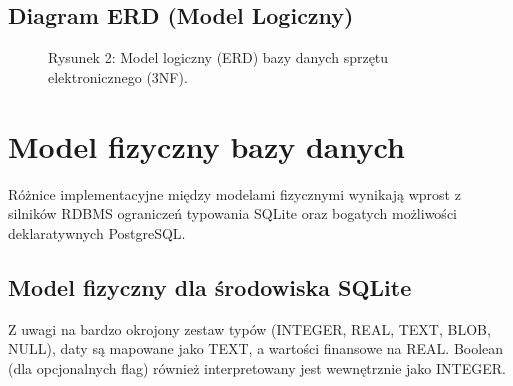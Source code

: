 \documentclass[letterpaper,10pt,polish]{sphinxmanual}
\begin{document}
\subsection{Diagram ERD (Model Logiczny)}
\label{\detokenize{rozdzia_u0142_3/BD_PlanBazyDanych_zad1/index:diagram-erd-model-logiczny}}
\begin{figure}[htbp]
\centering
\capstart

\noindent{}
\caption{Rysunek 2: Model logiczny (ERD) bazy danych sprzętu elektronicznego (3NF).}\label{\detokenize{rozdzia_u0142_3/BD_PlanBazyDanych_zad1/index:id2}}\end{figure}


\section{Model fizyczny bazy danych}
\label{\detokenize{rozdzia_u0142_3/BD_PlanBazyDanych_zad1/index:model-fizyczny-bazy-danych}}
\sphinxAtStartPar
Różnice implementacyjne między modelami fizycznymi wynikają wprost z silników RDBMS \textendash{} ograniczeń typowania SQLite oraz bogatych możliwości deklaratywnych PostgreSQL.


\subsection{Model fizyczny dla środowiska SQLite}
\label{\detokenize{rozdzia_u0142_3/BD_PlanBazyDanych_zad1/index:model-fizyczny-dla-srodowiska-sqlite}}
\sphinxAtStartPar
Z uwagi na bardzo okrojony zestaw typów (INTEGER, REAL, TEXT, BLOB, NULL), daty są mapowane jako TEXT, a wartości finansowe na REAL. Boolean (dla opcjonalnych flag) również interpretowany jest wewnętrznie jako INTEGER.
\end{document}
